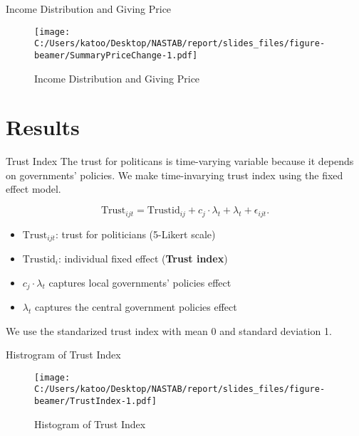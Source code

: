 \documentclass[
  ignorenonframetext,
]{beamer}
\providecommand{\tightlist}{%
  \setlength{\itemsep}{0pt}\setlength{\parskip}{0pt}}
\begin{document}
\begin{frame}{Income Distribution and Giving Price}
\protect\hypertarget{income-distribution-and-giving-price}{}
\begin{figure}
\centering
\texttt{[image: C:/Users/katoo/Desktop/NASTAB/report/slides\_files/figure-beamer/SummaryPriceChange-1.pdf]}
\caption{Income Distribution and Giving Price}
\end{figure}
\end{frame}

\hypertarget{results}{%
\section{Results}\label{results}}

\begin{frame}{Trust Index}
\protect\hypertarget{trust-index}{}
The trust for politicans is time-varying variable because it depends on
governments' policies. We make time-invarying trust index using the
fixed effect model.

\[
    \text{Trust}_{ijt} = \text{Trustid}_{ij} + c_j \cdot \lambda_t + \lambda_t + \epsilon_{ijt}.
\]

\begin{itemize}
\tightlist
\item
  \(\text{Trust}_{ijt}\): trust for politicians (5-Likert scale)
\item
  \(\text{Trustid}_i\): individual fixed effect (\textbf{Trust index})
\item
  \(c_j \cdot \lambda_t\) captures local governments' policies effect
\item
  \(\lambda_t\) captures the central government policies effect
\end{itemize}

We use the standarized trust index with mean 0 and standard deviation 1.
\end{frame}

\begin{frame}{Histrogram of Trust Index}
\protect\hypertarget{histrogram-of-trust-index}{}
\begin{figure}
\centering
\texttt{[image: C:/Users/katoo/Desktop/NASTAB/report/slides\_files/figure-beamer/TrustIndex-1.pdf]}
\caption{Histogram of Trust Index}
\end{figure}
\end{frame}
\end{document}

